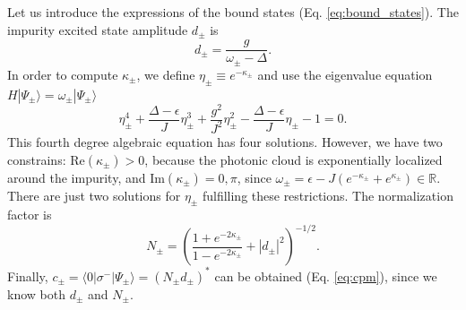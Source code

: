 \documentclass[aps,pra,twocolumn,floatfix,superscriptaddress]{revtex4-1}%
\begin{document}



Let us introduce the expressions of the bound states (Eq. \eqref{eq:bound_states}). The impurity excited state amplitude $d_\pm$ is
\begin{equation}
d_\pm = \frac{g}{\omega_\pm - \Delta}.\label{eq:d_bound_states}
\end{equation}
In order to compute $\kappa_\pm$, we define $\eta_\pm \equiv e^{-\kappa_\pm}$ and use the eigenvalue equation $H|\Psi_\pm\rangle = \omega_\pm|\Psi_\pm\rangle$ \cite{Longo2011}
\begin{equation}\label{eq:eta}
\eta_\pm ^4 + \frac{\Delta-\epsilon}{J} \eta_\pm ^3 + \frac{g^2}{J^2} \eta_\pm ^2 - \frac{\Delta-\epsilon}{J} \eta_\pm - 1 = 0.
\end{equation}
This fourth degree algebraic equation has four solutions. However, we have two constrains: $\text{Re}(\kappa_\pm)>0$, because the photonic cloud is exponentially localized around the impurity, and $\text{Im}(\kappa_\pm)=0,\pi$, since $\omega_\pm = \epsilon - J(e^{-\kappa_\pm} + e^{\kappa_\pm}) \in \mathbb{R}$. There are just two solutions for $\eta_\pm$ fulfilling these restrictions.
The normalization factor is
\begin{equation}\label{eq:Npm}
N_\pm = \left(\frac{1+e^{-2\kappa_\pm}}{1-e^{-2\kappa_\pm}}+|d_\pm|^2\right)^{-1/2}.
\end{equation}
Finally, $c_\pm=\langle 0|\sigma^-|\Psi_\pm\rangle=(N_\pm d_\pm)^*$ can be obtained (Eq. \eqref{eq:cpm}), since we know both $d_\pm$ and $N_\pm$.
\end{document}

